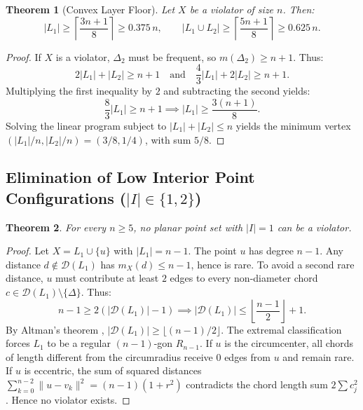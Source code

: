 \documentclass[11pt,reqno]{article}
\newtheorem{theorem}{Theorem}
\theoremstyle{definition}
\begin{document}
\begin{theorem}[Convex Layer Floor]\label{thm:layer_floor}
Let $X$ be a violator of size $n$. Then:
\[
|L_1| \ge \left\lceil \frac{3n + 1}{8} \right\rceil \ge 0.375\, n, \qquad |L_1 \cup L_2| \ge \left\lceil \frac{5n + 1}{8} \right\rceil \ge 0.625\, n.
\]
\end{theorem}
\begin{proof}
If $X$ is a violator, $\Delta_2$ must be frequent, so $m(\Delta_2) \ge n + 1$. Thus:
\[
2|L_1| + |L_2| \ge n + 1 \quad \text{and} \quad \frac{4}{3}|L_1| + 2|L_2| \ge n + 1.
\]
Multiplying the first inequality by $2$ and subtracting the second yields:
\[
\frac{8}{3}|L_1| \ge n + 1 \implies |L_1| \ge \frac{3(n+1)}{8}.
\]
Solving the linear program subject to $|L_1| + |L_2| \le n$ yields the minimum vertex $(|L_1|/n, |L_2|/n) = (3/8, 1/4)$, with sum $5/8$.
\end{proof}

\subsection{Elimination of Low Interior Point Configurations ($|I| \in \{1, 2\}$)}

\begin{theorem}\label{thm:single_interior}
For every $n \ge 5$, no planar point set with $|I| = 1$ can be a violator.
\end{theorem}
\begin{proof}
Let $X = L_1 \cup \{u\}$ with $|L_1| = n - 1$. The point $u$ has degree $n - 1$. Any distance $d \notin \mathcal{D}(L_1)$ has $m_X(d) \le n - 1$, hence is rare. To avoid a second rare distance, $u$ must contribute at least $2$ edges to every non-diameter chord $c \in \mathcal{D}(L_1) \setminus \{\Delta\}$. Thus:
\[
n - 1 \ge 2(|\mathcal{D}(L_1)| - 1) \implies |\mathcal{D}(L_1)| \le \left\lfloor \frac{n-1}{2} \right\rfloor + 1.
\]
By Altman's theorem \cite{Alt63}, $|\mathcal{D}(L_1)| \ge \lfloor (n-1)/2 \rfloor$. The extremal classification forces $L_1$ to be a regular $(n-1)$-gon $R_{n-1}$.
If $u$ is the circumcenter, all chords of length different from the circumradius receive $0$ edges from $u$ and remain rare. If $u$ is eccentric, the sum of squared distances $\sum_{k=0}^{n-2} \|u - v_k\|^2 = (n-1)(1 + r^2)$ contradicts the chord length sum $2 \sum c_j^2$. Hence no violator exists.
\end{proof}
\end{document}
